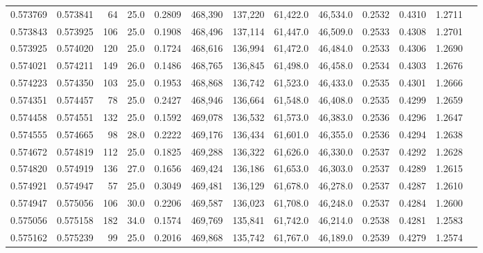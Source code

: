 \begin{tabular}{rrrrrrrrrrrrr}
0.573769 & 0.573841 &    64 & 25.0 &                                     0.2809 & 468,390 & 137,220 &  61,422.0 &  46,534.0 & 0.2532 & 0.4310 & 1.2711 \\
0.573843 & 0.573925 &   106 & 25.0 &                                     0.1908 & 468,496 & 137,114 &  61,447.0 &  46,509.0 & 0.2533 & 0.4308 & 1.2701 \\
0.573925 & 0.574020 &   120 & 25.0 &                                     0.1724 & 468,616 & 136,994 &  61,472.0 &  46,484.0 & 0.2533 & 0.4306 & 1.2690 \\
0.574021 & 0.574211 &   149 & 26.0 &                                     0.1486 & 468,765 & 136,845 &  61,498.0 &  46,458.0 & 0.2534 & 0.4303 & 1.2676 \\
0.574223 & 0.574350 &   103 & 25.0 &                                     0.1953 & 468,868 & 136,742 &  61,523.0 &  46,433.0 & 0.2535 & 0.4301 & 1.2666 \\
0.574351 & 0.574457 &    78 & 25.0 &                                     0.2427 & 468,946 & 136,664 &  61,548.0 &  46,408.0 & 0.2535 & 0.4299 & 1.2659 \\
0.574458 & 0.574551 &   132 & 25.0 &                                     0.1592 & 469,078 & 136,532 &  61,573.0 &  46,383.0 & 0.2536 & 0.4296 & 1.2647 \\
0.574555 & 0.574665 &    98 & 28.0 &                                     0.2222 & 469,176 & 136,434 &  61,601.0 &  46,355.0 & 0.2536 & 0.4294 & 1.2638 \\
0.574672 & 0.574819 &   112 & 25.0 &                                     0.1825 & 469,288 & 136,322 &  61,626.0 &  46,330.0 & 0.2537 & 0.4292 & 1.2628 \\
0.574820 & 0.574919 &   136 & 27.0 &                                     0.1656 & 469,424 & 136,186 &  61,653.0 &  46,303.0 & 0.2537 & 0.4289 & 1.2615 \\
0.574921 & 0.574947 &    57 & 25.0 &                                     0.3049 & 469,481 & 136,129 &  61,678.0 &  46,278.0 & 0.2537 & 0.4287 & 1.2610 \\
0.574947 & 0.575056 &   106 & 30.0 &                                     0.2206 & 469,587 & 136,023 &  61,708.0 &  46,248.0 & 0.2537 & 0.4284 & 1.2600 \\
0.575056 & 0.575158 &   182 & 34.0 &                                     0.1574 & 469,769 & 135,841 &  61,742.0 &  46,214.0 & 0.2538 & 0.4281 & 1.2583 \\
0.575162 & 0.575239 &    99 & 25.0 &                                     0.2016 & 469,868 & 135,742 &  61,767.0 &  46,189.0 & 0.2539 & 0.4279 & 1.2574 \\

\end{tabular}
